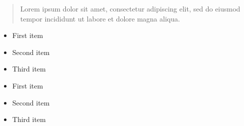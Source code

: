 \documentclass[10pt,a4paper,ragged2e,withhyper]{altacv}
\begin{document}
\begin{paracol}{2}
        
        
        
        \newpage
        
        \switchcolumn
        
            \begin{quote}
                Lorem ipsum dolor sit amet, consectetur adipiscing elit, sed do eiusmod tempor incididunt ut labore et dolore magna aliqua.
            \end{quote}
        
            \begin{itemize}
                \item First item
                \item Second item
                \item Third item
            \end{itemize}
            \divider
            
            \begin{itemize}
                \item First item
                \item Second item
                \item Third item
            \end{itemize}
        

\end{paracol}
\end{document}
